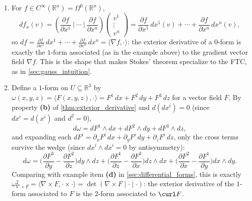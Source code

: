 \begin{example}
\label{ex:exterior_derivative_gradient_curl}
\begin{enumerate}[label=\textbf{(\alph*)}]
  \item For $f \in C^\infty(\mathbb{R}^n) = \Omega^0(\mathbb{R}^n)$,
  \[df_x(v) = \left(\frac{\partial f}{\partial x^1}\ \Big|\ \cdots\ \Big|\ \frac{\partial f}
    {\partial x^n}\right)\!\begin{pmatrix}v^1\\ \vdots \\ v^n\end{pmatrix}
    = \frac{\partial f}{\partial x^1}\,dx^1(v) + \cdots + \frac{\partial f}{\partial x^n}\,
    dx^n(v),\]
  so $df = \frac{\partial f}{\partial x^1}\,dx^1 + \cdots + \frac{\partial f}{\partial x^n}\,
  dx^n = \langle \nabla f,\cdot\rangle$: the exterior derivative of a $0$-form is exactly the
  $1$-form associated (as in the example above) to the gradient vector field $\nabla f$. This
  is the shape that makes Stokes' theorem specialize to the FTC, as in
  \cref{sec:gauss_intuition}.
  \item Define a $1$-form on $U \subseteq \mathbb{R}^3$ by $\omega(x,y,z) = \langle
  F(x,y,z),\cdot\rangle = F^1\,dx+F^2\,dy+F^3\,dz$ for a vector field $F$. By property
  \textbf{(b)} of
  \cref{thm:exterior_derivative} and $d(dx^i)=0$ (since $dx^i = d(x^i)$ and $d^2=0$),
  \[
  d\omega = dF^1\wedge dx + dF^2\wedge dy + dF^3\wedge dz,
  \]
  and expanding each $dF^i = \partial_x F^i\,dx+\partial_y F^i\,dy+\partial_z F^i\,dz$, only
  the cross terms survive the wedge (since $dx^i\wedge dx^i=0$ by antisymmetry):
  \[
  d\omega = \Big(\frac{\partial F^3}{\partial y}-\frac{\partial F^2}{\partial z}\Big)dy\wedge
    dz + \Big(\frac{\partial F^1}{\partial z}-\frac{\partial F^3}{\partial x}\Big)dz\wedge dx
    + \Big(\frac{\partial F^2}{\partial x}-\frac{\partial F^1}{\partial y}\Big)dx\wedge dy.
  \]
  Comparing with example item \textbf{(d)} in \cref{sec:differential_forms}, this is exactly
  $\omega_{\nabla\times F}^2 = \langle\nabla\times F,\cdot\times\cdot\rangle = \det(\nabla
  \times F\mid\cdot\mid\cdot)$: the exterior derivative of the $1$-form associated to $F$ is
  the $2$-form associated to $\curl F$.


\end{enumerate}
\end{example}
